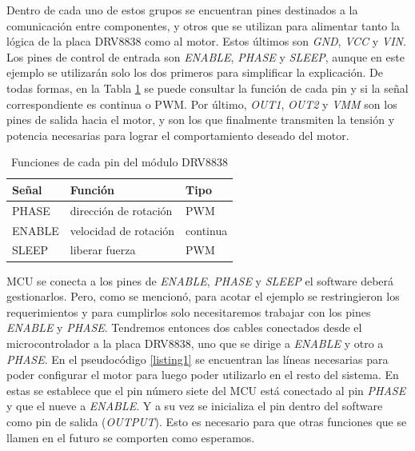 Dentro de cada uno de estos grupos se encuentran pines destinados a la comunicación entre componentes, y otros que se utilizan para alimentar tanto la lógica de la placa \gls{DRV8838} como al motor. Estos últimos son \textit{GND}, \textit{VCC} y \textit{VIN}. Los pines de control de entrada son \textit{ENABLE}, \textit{PHASE} y \textit{SLEEP}, aunque en este ejemplo se utilizarán solo los dos primeros para simplificar la explicación. De todas formas, en la Tabla \ref{funciones_pin_drv8838} se puede consultar la función de cada pin y si la señal correspondiente es continua o \gls{PWM}. Por último, \textit{OUT1}, \textit{OUT2} y \textit{VMM} son los pines de salida hacia el motor, y son los que finalmente transmiten la tensión y potencia necesarias para lograr el comportamiento deseado del motor.

\begin{table}[H]
\centering
\begin{tabular}{|l|l|l|}
    \hline %
    \textbf{Señal} & \textbf{Función} & \textbf{Tipo} \\
    \hline %
    PHASE  & dirección de rotación & PWM   \\ \hline
    ENABLE & velocidad de rotación & continua \\ \hline
    SLEEP  & liberar fuerza        & PWM   \\ \hline
\end{tabular}
\caption{Funciones de cada pin del módulo DRV8838}
\label{funciones_pin_drv8838}
\end{table}

\gls{MCU} se conecta a los pines de \textit{ENABLE}, \textit{PHASE} y \textit{SLEEP} el software deberá gestionarlos. Pero, como se mencionó, para acotar el ejemplo se restringieron los requerimientos y para cumplirlos solo necesitaremos trabajar con los pines \textit{ENABLE} y \textit{PHASE}. Tendremos entonces dos cables conectados desde el \gls{microcontrolador} a la placa \gls{DRV8838}, uno que se dirige a \textit{ENABLE} y otro a \textit{PHASE}. En el pseudocódigo \ref{listing1} se encuentran las líneas necesarias para poder configurar el motor para luego poder utilizarlo en el resto del sistema. En estas se establece que el pin número siete del \gls{MCU} está conectado al pin \textit{PHASE} y que el nueve a \textit{ENABLE}. Y a su vez se inicializa el pin dentro del software como pin de salida (\textit{OUTPUT}). Esto es necesario para que otras funciones que se llamen en el futuro se comporten como esperamos.

